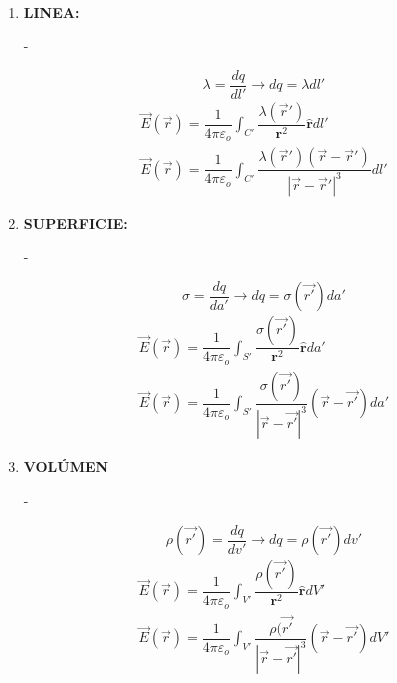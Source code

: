 \documentclass[../main]{subfiles}
\begin{document}
\begin{minipage}{0.5\textwidth}
    
\end{minipage}
\\[0.5cm]
\begin{enumerate}
    \item \textbf{LINEA:} \\
    \begin{minipage}{0.5\textwidth}
    -
    \end{minipage}
    \begin{minipage}{0.5\textwidth}
    \begin{equation}
        \lambda=\dfrac{dq}{dl'}\rightarrow dq=\lambda dl'
    \end{equation}
    \begin{align}
        \vec{E}({\vec{r}})=\dfrac{1}{4\pi \varepsilon_o}\int_{C'} \dfrac{\lambda(\vec{r}')}{\mathbf{r}^2}\hat{\mathbf{r}}dl' \\
        \vec{E}({\vec{r}})=\dfrac{1}{4\pi \varepsilon_o} \int_{C'} \dfrac{\lambda(\vec{r}')(\vec{r}-\vec{r}')}{|\vec{r}-\vec{r}'|^3}dl'
    \end{align}
    \end{minipage}
    \item \textbf{SUPERFICIE:} \\
    \begin{minipage}{0.5\textwidth}
        -
    \end{minipage}
    \begin{minipage}{0.5\textwidth}
        \begin{equation}
            \sigma=\dfrac{dq}{da'}\rightarrow dq=\sigma(\vec{r'}) da'
        \end{equation}
        \begin{align}
            \vec{E}(\vec{r})=\dfrac{1}{4\pi \varepsilon_o} \int_{S'} \dfrac{\sigma(\vec{r'})}{\mathbf{r}^2}\hat{\mathbf{r}}da' \\
            \vec{E}(\vec{r})=\dfrac{1}{4\pi \varepsilon_o} \int_{S'} \dfrac{\sigma(\vec{r'})}{|\vec{r}-\vec{r'}|^3}(\vec{r}-\vec{r'}) da'
        \end{align}
    \end{minipage}
    \item \textbf{VOLÚMEN} \\
    \begin{minipage}{0.5\textwidth}
        -
    \end{minipage}
    \begin{minipage}{0.5\textwidth}
        \begin{equation}
            \rho(\vec{r'})=\dfrac{dq}{dv'} \rightarrow dq=\rho(\vec{r'})dv'
        \end{equation}
        \begin{align}
            \vec{E}(\vec{r})=\dfrac{1}{4\pi \varepsilon_o}\int_{V'} \dfrac{\rho(\vec{r'})}{\mathbf{r}^2}\hat{\mathbf{r}}dV' \\
            \vec{E}(\vec{r})=\dfrac{1}{4\pi \varepsilon_o}\int_{V'} \dfrac{\rho(\vec{r'}}{|\vec{r}-\vec{r'}|^3} (\vec{r}-\vec{r'})dV'
        \end{align}
    \end{minipage}
\end{enumerate}
\end{document}
